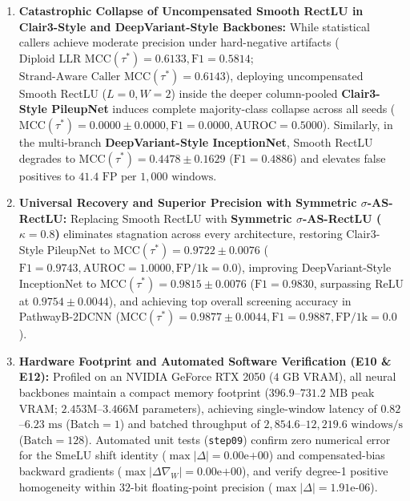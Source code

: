 \documentclass[10pt,a4paper]{article}
\begin{document}
\begin{enumerate}
    \item \textbf{Catastrophic Collapse of Uncompensated Smooth RectLU in Clair3-Style and DeepVariant-Style Backbones:} While statistical callers achieve moderate precision under hard-negative artifacts ($\text{Diploid LLR MCC}(\tau^*) = 0.6133, \text{F1} = 0.5814$; $\text{Strand-Aware Caller MCC}(\tau^*) = 0.6143$), deploying uncompensated Smooth RectLU ($L=0, W=2$) inside the deeper column-pooled \textbf{Clair3-Style PileupNet} induces complete majority-class collapse across all seeds ($\text{MCC}(\tau^*) = 0.0000 \pm 0.0000, \text{F1} = 0.0000, \text{AUROC} = 0.5000$). Similarly, in the multi-branch \textbf{DeepVariant-Style InceptionNet}, Smooth RectLU degrades to $\text{MCC}(\tau^*) = 0.4478 \pm 0.1629$ ($\text{F1} = 0.4886$) and elevates false positives to $41.4\text{ FP per }1,000\text{ windows}$.
    \item \textbf{Universal Recovery and Superior Precision with Symmetric $\sigma$-AS-RectLU:} Replacing Smooth RectLU with \textbf{Symmetric $\sigma$-AS-RectLU ($\kappa=0.8$)} eliminates stagnation across every architecture, restoring Clair3-Style PileupNet to $\text{MCC}(\tau^*) = 0.9722 \pm 0.0076$ ($\text{F1} = 0.9743, \text{AUROC} = 1.0000, \text{FP/1k} = 0.0$), improving DeepVariant-Style InceptionNet to $\text{MCC}(\tau^*) = \mathbf{0.9815 \pm 0.0076}$ ($\text{F1} = \mathbf{0.9830}$, surpassing ReLU at $0.9754 \pm 0.0044$), and achieving top overall screening accuracy in PathwayB-2DCNN ($\text{MCC}(\tau^*) = \mathbf{0.9877 \pm 0.0044}, \text{F1} = \mathbf{0.9887}, \text{FP/1k} = \mathbf{0.0}$).
    \item \textbf{Hardware Footprint and Automated Software Verification (E10 \& E12):} Profiled on an NVIDIA GeForce RTX 2050 ($4\text{ GB}$ VRAM), all neural backbones maintain a compact memory footprint ($396.9$--$731.2\text{ MB}$ peak VRAM; $2.453\text{M}$--$3.466\text{M}$ parameters), achieving single-window latency of $0.82$--$6.23\text{ ms}$ ($\text{Batch}=1$) and batched throughput of $2,854.6$--$12,219.6\text{ windows/s}$ ($\text{Batch}=128$). Automated unit tests (\texttt{step09}) confirm zero numerical error for the SmeLU shift identity ($\max|\Delta| = 0.00\text{e+}00$) and compensated-bias backward gradients ($\max|\Delta\nabla_W| = 0.00\text{e+}00$), and verify degree-1 positive homogeneity within $32$-bit floating-point precision ($\max|\Delta| = 1.91\text{e-}06$).
\end{enumerate}
\end{document}
